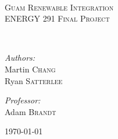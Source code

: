 \begin{titlepage}
  \begin{center}

    \HRule \\[0.4cm]

    \textsc{\LARGE Guam Renewable Integration}\\[0.2cm]
    \textsc{\large ENERGY 291 Final Project}
    
    
    \HRule \\[1.5cm]

    \begin{minipage}{0.45\textwidth}
      \begin{flushleft} \large
        \emph{Authors:}\\
        Martin \textsc{Chang}\\
        Ryan \textsc{Satterlee}
      \end{flushleft}
    \end{minipage}
    \begin{minipage}{0.5\textwidth}
      \begin{flushright} \large
        \emph{Professor:}\\
        Adam \textsc{Brandt}\\%
      \end{flushright}
    \end{minipage}

    \vfill
    {\large \today}

  \end{center}
\end{titlepage}